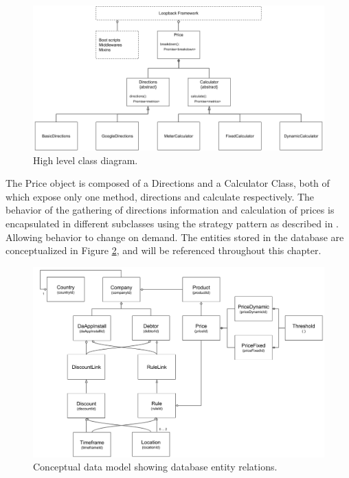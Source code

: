 \begin{figure}[H]
	\centering
	\includegraphics[width=1\textwidth]{ClassDiagram}
	\caption[Class Diagram]{High level class diagram.}
	\label{fig:Class Diagram}
\end{figure}

The Price object is composed of a Directions and a Calculator Class, both of which expose only one method, directions and calculate respectively. The behavior of the gathering of directions information and calculation of prices is encapsulated in different subclasses using the strategy pattern as described in \cite{gof}. Allowing behavior to change on demand. The entities stored in the database are conceptualized in Figure \ref{fig:Data Model}, and will be referenced throughout this chapter.

\begin{figure}[H]
	\centering
	\includegraphics[width=1\textwidth]{DataModel}
	\caption[Data Model]{Conceptual data model showing database entity relations.}
	\label{fig:Data Model}
\end{figure}

